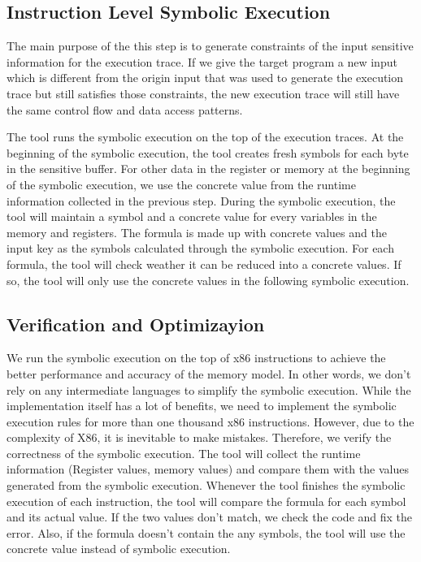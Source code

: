 \subsection{Instruction Level Symbolic Execution}
The main purpose of the this step is to generate constraints of the input sensitive information for the execution trace. If we give the target program a new input which is different from the origin input that was used to generate the execution trace but still satisfies those constraints, the new execution trace will still have the same control flow and data access patterns. 

The tool runs the symbolic execution on the top of the execution traces. At the beginning of the symbolic execution, the tool creates fresh symbols for each byte in the sensitive buffer. For other data in the register or memory at the beginning of the symbolic execution, we use the concrete value from the runtime information collected in the previous step. During the symbolic execution, the tool will maintain a symbol and a concrete value for every variables in the memory and registers. The formula is made up with concrete values and the input key as the symbols calculated through the symbolic execution. For each formula, the tool will check weather it can be reduced into a concrete values. If so, the tool will only use the concrete values in the following symbolic execution.

\subsection{Verification and Optimizayion}
We run the symbolic execution on the top of x86 instructions to achieve the better performance and accuracy of the memory model. In other words, we don’t rely on any intermediate languages to simplify the symbolic execution. While the implementation itself has a lot of benefits, we need to implement the symbolic execution rules for more than one thousand x86 instructions. However, due to the complexity of X86, it is inevitable to make mistakes. Therefore, we verify the correctness of the symbolic execution. The tool will collect the runtime information (Register values, memory values) and compare them with the values generated from the symbolic execution. Whenever the tool finishes the symbolic execution of each instruction, the tool will compare the formula for each symbol and its actual value. If the two values don’t match, we check the code and fix the error. Also, if the formula doesn’t contain the any symbols, the tool will use the concrete value instead of symbolic execution.

